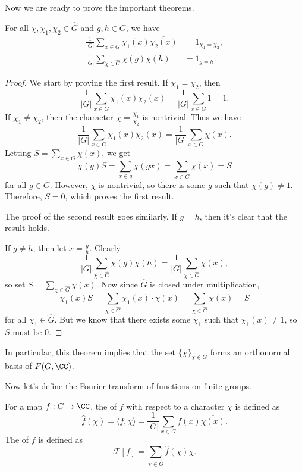 \documentclass{scrartcl}
\begin{document}
Now we are ready to prove the important theorems. 

\begin{theorem}
	For all $\chi, \chi_1, \chi_2\in \widehat{G}$ and $g, h\in G$, we have 
	\begin{align*}
		\frac{1}{|G|}\sum_{x\in G} \chi_1(x)\overline{\chi_2(x)}&=1_{\chi_1=\chi_2}, \\
		\frac{1}{|G|}\sum_{\chi\in \widehat{G}} \chi(g)\overline{\chi(h)} &= 1_{g=h}.
	\end{align*}
\end{theorem}

\begin{proof}
	We start by proving the first result. 
	If $\chi_1=\chi_2$, then 
	$$\frac{1}{|G|} \sum_{x\in G} \chi_1(x) \overline{\chi_2(x)}=\frac{1}{|G|}\sum_{x\in G} 1 = 1.$$
	If $\chi_1 \neq \chi_2$, then the character $\chi = \frac{\chi_1}{\chi_2}$ is nontrivial. 
	Thus we have
	$$\frac{1}{|G|}\sum_{x\in G}\chi_1(x)\overline{\chi_2(x)} = \frac{1}{|G|} \sum_{x\in G} \chi (x).$$
	Letting $S = \sum_{x\in G}\chi(x)$, we get 
	$$\chi(g) S = \sum_{x\in g}\chi (gx) = \sum_{x\in G} \chi(x) = S$$ 
	for all $g\in G$. However, $\chi$ is nontrivial, so there is some $g$ such that $\chi(g)\neq 1$. 
	Therefore, $S=0$, which proves the first result. 
	
	The proof of the second result goes similarly. 
	If $g=h$, then it's clear that the result holds. 
	
	If $g\neq h$, then let $x = \frac{g}{h}$. Clearly 
	$$\frac{1}{|G|}\sum_{\chi \in \widehat{G}} \chi(g)\overline{\chi(h)} = 
	\frac{1}{|G|} \sum_{\chi \in \widehat{G}} \chi(x),$$
	so set $S = \sum_{\chi\in \widehat{G}} \chi(x)$. 
	Now since $\widehat{G}$ is closed under multiplication, 
	$$\chi_1 (x) S = \sum_{\chi\in \widehat{G}} \chi_1 (x)\cdot \chi(x) = \sum_{\chi \in \widehat{G}} \chi(x) = S$$
	for all $\chi_1\in \widehat{G}$. 
	But we know that there exists some $\chi_1$ such that $\chi_1(x)\neq 1$, so $S$ must be $0$. 
\end{proof}

In particular, this theorem implies that the set $\{\chi\}_{\chi \in \widehat{G}}$ forms an orthonormal basis 
of $F(G, \CC)$. 

Now let's define the Fourier transform of functions on finite groups. 

\begin{definition}
	For a map $f: G\rightarrow \CC$, the  of $f$ with respect to a character 
	$\chi$ is defined as 
	$$\widehat{f}(\chi) = \langle f, \chi \rangle = \frac{1}{|G|} \sum_{x\in G} f(x) \overline{\chi(x)}.$$
	The  of $f$ is defined as 
	$$\mathcal{F}[f] = \sum_{\chi \in \widehat{G}} \widehat{f}(\chi)\chi.$$
\end{definition}
\end{document}
